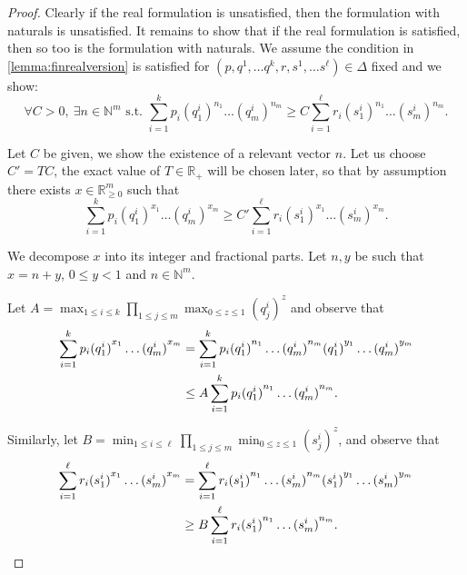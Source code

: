 \documentclass{lmcs}
\theoremstyle{plain}
\theoremstyle{definition}
\theoremstyle{remark}
\begin{document}
\begin{proof}
Clearly if the real formulation is unsatisfied, then the formulation with naturals is unsatisfied. It remains to show that if the real formulation is satisfied, then so too is the formulation with naturals. We assume the condition in \cref{lemma:finrealversion} is satisfied for $({p},{q}^1,\dots {q}^{k}, {r},{s}^1,\dots {s}^{\ell}) \in \Delta$ fixed and we  show: \[\forall C > 0, \ \exists {n} \in \mathbb{N}^m \text{ s.t. } \sum_{i=1}^{k} p_i{({q}^i_1)}^{n_1}\dots {({q}^i_m)}^{n_m} \ge C\sum_{i=1}^{\ell} r_i{({s}^i_1)}^{n_1}\dots {({s}^i_m)}^{n_m}.\]

Let $C$ be given, we show the existence of a relevant vector ${n}$. Let us choose $C' = TC$, the exact value of $T\in\mathbb{R}_{+}$ will be chosen later, so that by assumption there exists ${x} \in \mathbb{R}_{\ge 0}^m$ such that  \begin{equation}\label{eq:mainin} \sum_{i=1}^{k} p_i{({q}^i_1)}^{x_1}\dots {({q}^i_m)}^{x_m} \ge C' \sum_{i=1}^{\ell} r_i{({s}^i_1)}^{x_1}\dots {({s}^i_m)}^{x_m}.\end{equation}

We decompose ${x}$ into its integer  and fractional parts. Let ${n},{y}$ be such that ${x} = {n} + {y}$, ${0}\le{y}< {1}$ and ${n} \in \mathbb{N}^m $.

Let $\displaystyle A = \max_{1\le i \le k}   \prod_{1\le j \le m} \max_{0\le z \le 1} {({q}^i_j)}^{z} $ and observe that
\begin{align} \notag \sum_{i=1}^{k} p_i{({q}^i_1)}^{x_1}\dots {({q}^i_m)}^{x_m} &= \sum_{i=1}^{k} p_i{({q}^i_1)}^{n_1}\dots {({q}^i_m)}^{n_m}{({q}^i_1)}^{y_1}\dots {({q}^i_m)}^{y_m}
\\
\label{eq:firstin}&\le A \sum_{i=1}^{k} p_i{({q}^i_1)}^{n_1}\dots {({q}^i_m)}^{n_m}.\end{align}

Similarly, let $\displaystyle B = \min_{1\le i \le \ell}   \prod_{1\le j \le m} \min_{0\le z \le 1} {({s}^i_j)}^{z} $, and observe that
\begin{align}
\sum_{i=1}^{\ell} r_i{({s}^i_1)}^{x_1}\dots {({s}^i_m)}^{x_m} &= \sum_{i=1}^{\ell} r_i{({s}^i_1)}^{n_1}\dots {({s}^i_m)}^{n_m}{({s}^i_1)}^{y_1}\dots {({s}^i_m)}^{y_m}\notag
\\
\label{eq:thirdin}&\ge B \sum_{i=1}^{\ell} r_i{({s}^i_1)}^{n_1}\dots {({s}^i_m)}^{n_m}.\end{align}


\end{proof}
\end{document}

